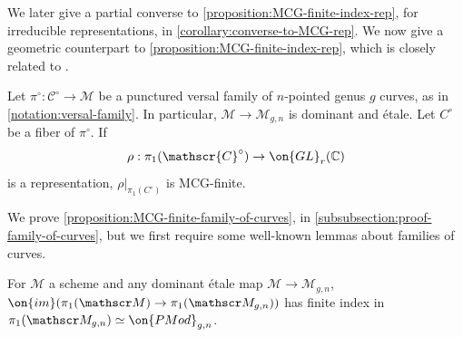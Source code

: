We later give a partial converse to \autoref{proposition:MCG-finite-index-rep},
for irreducible representations, in \autoref{corollary:converse-to-MCG-rep}.
We now give a geometric counterpart to
\autoref{proposition:MCG-finite-index-rep},
which is closely related to \cite[Theorem A1]{CH:isomonodromic}.
\begin{proposition}
\notready
\label{proposition:MCG-finite-family-of-curves}
Let $\pi^\circ: \mathscr{C}^\circ\to \mathscr{M}$ be a punctured versal family
of $n$-pointed genus $g$ curves, as in \autoref{notation:versal-family}. In
particular, $\mathscr M \to \mathscr M_{g,n}$ is dominant and \'etale.
	Let $C^\circ$ be a fiber of $\pi^\circ$. If
	$$\rho:\pi_1(\mathscr{C}^\circ)\to \on{GL}_r(\mathbb{C})$$ is a representation, $\rho|_{\pi_1(C^\circ)}$ is MCG-finite.
\end{proposition}
We prove \autoref{proposition:MCG-finite-family-of-curves}, in
\autoref{subsubsection:proof-family-of-curves},
but we first require some well-known lemmas about families of curves.
\begin{lemma}
\notready
	\label{lemma:finite-index-from-dominant-map}
	For $\mathscr M$ a scheme and any dominant \'etale map
	$\mathscr M \to \mathscr M_{g,n}$,
	$\on{im}(\pi_1(\mathscr M) \to \pi_1(\mathscr M_{g,n}))$
	has finite index in
$\pi_1(\mathscr M_{g,n})\simeq \on{PMod}_{g,n}$.
\end{lemma}
